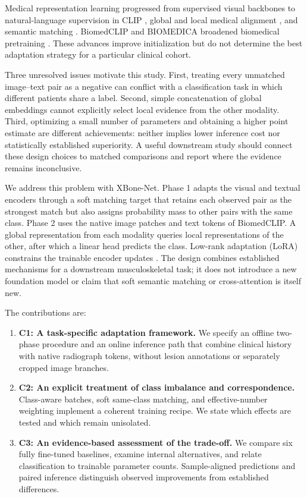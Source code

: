 \documentclass{llncs}
\begin{document}
Medical representation learning progressed from supervised visual backbones \cite{ResNet,DenseNet} to natural-language supervision in CLIP \cite{CLIP}, global and local medical alignment \cite{ConVIRT,GLoRIA}, and semantic matching \cite{MedCLIP}. BiomedCLIP and BIOMEDICA broadened biomedical pretraining \cite{BiomedCLIP,BIOMEDICA}. These advances improve initialization but do not determine the best adaptation strategy for a particular clinical cohort.

Three unresolved issues motivate this study. First, treating every unmatched image--text pair as a negative can conflict with a classification task in which different patients share a label. Second, simple concatenation of global embeddings cannot explicitly select local evidence from the other modality. Third, optimizing a small number of parameters and obtaining a higher point estimate are different achievements: neither implies lower inference cost nor statistically established superiority. A useful downstream study should connect these design choices to matched comparisons and report where the evidence remains inconclusive.

We address this problem with XBone-Net. Phase 1 adapts the visual and textual encoders through a soft matching target that retains each observed pair as the strongest match but also assigns probability mass to other pairs with the same class. Phase 2 uses the native image patches and text tokens of BiomedCLIP. A global representation from each modality queries local representations of the other, after which a linear head predicts the class. Low-rank adaptation (LoRA) constrains the trainable encoder updates \cite{Hu2022LoRA}. The design combines established mechanisms for a downstream musculoskeletal task; it does not introduce a new foundation model or claim that soft semantic matching or cross-attention is itself new.

The contributions are:
\begin{enumerate}
\item \textbf{C1: A task-specific adaptation framework.} We specify an offline two-phase procedure and an online inference path that combine clinical history with native radiograph tokens, without lesion annotations or separately cropped image branches.
\item \textbf{C2: An explicit treatment of class imbalance and correspondence.} Class-aware batches, soft same-class matching, and effective-number weighting implement a coherent training recipe. We state which effects are tested and which remain unisolated.
\item \textbf{C3: An evidence-based assessment of the trade-off.} We compare six fully fine-tuned baselines, examine internal alternatives, and relate classification to trainable parameter counts. Sample-aligned predictions and paired inference distinguish observed improvements from established differences.
\end{enumerate}
\end{document}
